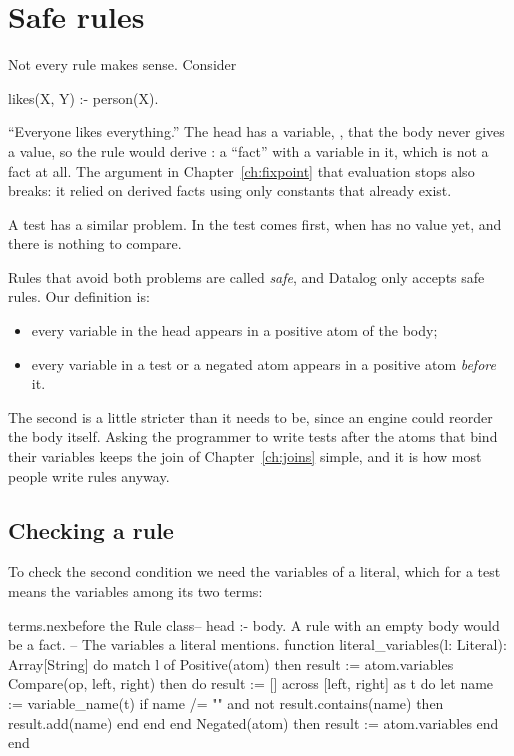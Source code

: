 \chapter{Safe rules}\label{ch:safety}

Not every rule makes sense. Consider

\begin{shell}
likes(X, Y) :- person(X).
\end{shell}

``Everyone likes everything.'' The head has a variable, , that the
body never gives a value, so the rule would derive : a
``fact'' with a variable in it, which is not a fact at all. The argument in
Chapter~\ref{ch:fixpoint} that evaluation stops also breaks: it relied on
derived facts using only constants that already exist.

A test has a similar problem. In  the test comes
first, when  has no value yet, and there is nothing to compare.

Rules that avoid both problems are called \emph{safe}, and Datalog only
accepts safe rules. Our definition is:
\begin{itemize}
  \item every variable in the head appears in a positive atom of the body;
  \item every variable in a test or a negated atom appears in a positive
    atom \emph{before} it.
\end{itemize}
The second is a little stricter than it needs to be, since an engine could
reorder the body itself. Asking the programmer to write tests after the
atoms that bind their variables keeps the join of Chapter~\ref{ch:joins}
simple, and it is how most people write rules anyway.

\section{Checking a rule}

To check the second condition we need the variables of a literal, which for
a test means the variables among its two terms:

\begin{addbefore}{terms.nex}{before the Rule class}{-- head :- body. A rule with an empty body would be a fact.}
-- The variables a literal mentions.
function literal_variables(l: Literal): Array[String]
do
  match l of
    Positive(atom) then result := atom.variables
    Compare(op, left, right) then
      do
        result := []
        across [left, right] as t do
          let name := variable_name(t)
          if name /= "" and not result.contains(name) then
            result.add(name)
          end
        end
      end
    Negated(atom) then result := atom.variables
  end
end
\end{addbefore}

